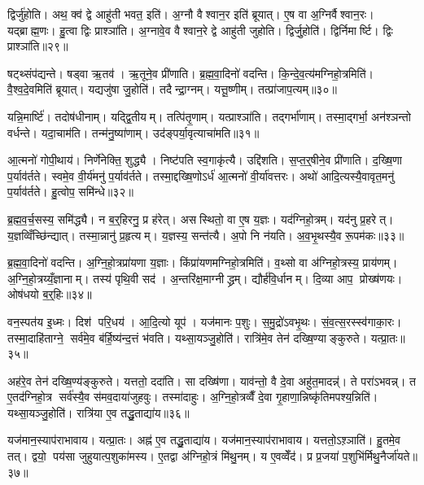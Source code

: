 द्विर्जु॑होति। अथ॒ क्व॑ द्वे आहु॑ती भवत॒ इति॑। अ॒ग्नौ वैश्वान॒र इति॑ ब्रूयात्। ए॒ष वा अ॒ग्निर्वैश्वान॒रः। यद्ब्राह्म॒णः। हु॒त्वा द्विः प्राश्ञा॑ति। अ॒ग्नावे॒व वैश्वान॒रे द्वे आहु॑ती जुहोति। द्विर्जु॒होति॑। द्विर्निमार्ष्टि। द्विः प्राश्ञा॑ति॥२९॥

षट्थ्संप॑द्यन्ते। षड्वा ऋ॒तव॑। ऋ॒तूने॒व प्री॑णाति। ब्र॒ह्म॒वा॒दिनो॑ वदन्ति। कि॒न्दे॒व॒त्य॑मग्निहो॒त्रमिति॑। वै॒श्व॒दे॒वमिति॑ ब्रूयात्। यद्यजु॑षा जु॒होति॑। तदैन्द्रा॒ग्नम्। यत्तू॒ष्णीम्। तत्प्रा॑जाप॒त्यम्॥३०॥

यन्नि॒मार्ष्टि॑। तदोष॑धीनाम्। यद्द्वि॒तीयम्। तत्पि॑तृ॒णाम्। यत्प्राश्ञा॑ति। तद्गर्भा॑णाम्। तस्मा॒द्गर्भा॒ अन॑श्ञन्तो वर्धन्ते। यदा॒चाम॑ति। तन्म॑नु॒ष्या॑णाम्। उद॑ङ्पर्या॒वृत्याचा॑मति॥३१॥

आ॒त्मनो॑ गोपी॒थाय॑। निर्णे॑नेक्ति॒ शुद्ध्यै। निष्ट॑पति स्व॒गाकृ॑त्यै। उद्दि॑शति। स॒प्त॒र्॒षीने॒व प्री॑णाति। द॒ख्षि॒णा प॒र्याव॑र्तते। स्वमे॒व वी॒र्य॑मनु॑ प॒र्याव॑र्तते। तस्मा॒द्दख्षि॒णोऽर्ध॑ आ॒त्मनो॑ वी॒र्या॑वत्तरः। अथो॑ आदि॒त्यस्यै॒वावृत॒मनु॑ प॒र्याव॑र्तते। हु॒त्वोप॒ समि॑न्धे॥३२॥

ब्र॒ह्म॒व॒र्च॒सस्य॒ समि॑द्ध्यै। न ब॒र्॒हिरनु॒ प्र ह॑रेत्। असस्थितो॒ वा ए॒ष य॒ज्ञः। यद॑ग्निहो॒त्रम्। यद॑नु प्र॒हरेत्। य॒ज्ञव्विँच्छि॑न्द्यात्। तस्मा॒न्नानु॑ प्र॒हृत्यम्। य॒ज्ञस्य॒ सन्त॑त्यै। अ॒पो नि न॑यति। अ॒व॒भृ॒थस्यै॒व रू॒पम॑कः॥३३॥\anuvakamend[अ॒भ॒व॒न्भ॒व॒ति॒ जु॒हु॒यान्न॑यति मार्ष्टि॒ द्विःप्राश्ञा॑ति प्राजाप॒त्यमाचा॑मतीन्धेऽकः]

ब्र॒ह्म॒वा॒दिनो॑ वदन्ति। अ॒ग्नि॒हो॒त्रप्रा॑यणा य॒ज्ञाः। किंप्रा॑यणमग्निहो॒त्रमिति॑। व॒थ्सो वा अ॑ग्निहो॒त्रस्य॒ प्राय॑णम्। अ॒ग्नि॒हो॒त्रय्यँ॒ज्ञानाम्। तस्य॑ पृथि॒वी सद॑। अ॒न्तरि॑क्ष॒माग्नीद्ध्रम्। द्यौर्\mbox{}ह॑वि॒र्धानम्। दि॒व्या आप॒ प्रोख्ष॑णयः। ओष॑धयो ब॒र्॒हिः॥३४॥

वन॒स्पत॑य इ॒ध्मः। दिश॑ परि॒धय॑। आ॒दि॒त्यो यूप॑। यज॑मानः प॒शुः। स॒मु॒द्रो॑ऽवभृ॒थः। सं॒व॒त्स॒रस्स्व॑गाका॒रः। तस्मा॒दाहि॑ताग्ने॒ सर्व॑मे॒व ब॑र्\mbox{}हि॒ष्य॑न्द॒त्तं भ॑वति। यथ्सा॒यञ्जु॒होति॑। रात्रि॑मे॒व तेन॑ दख्षि॒ण्याङ्कुरुते। यत्प्रा॒तः॥३५॥

अह॑रे॒व तेन॑ दख्षि॒ण्य॑ङ्कुरुते। यत्ततो॒ ददा॑ति। सा दख्षि॑णा। याव॑न्तो॒ वै दे॒वा अहु॑त॒मादन्न्॑। ते परा॑ऽभवन्न्। त ए॒तद॑ग्निहो॒त्र सर्व॑स्यै॒व स॑मव॒दाया॑जुहवुः। तस्मा॑दाहुः। अ॒ग्नि॒हो॒त्रव्वैँ दे॒वा गृ॒हाणा॒न्निष्कृ॑तिमपश्य॒न्निति॑। यथ्सा॒यञ्जु॒होति॑। रात्रि॑या ए॒व तद्धु॒ताद्या॑य॥३६॥

यज॑मान॒स्याप॑राभावाय। यत्प्रा॒तः। अह्न॑ ए॒व तद्धु॒ताद्या॑य। यज॑मान॒स्याप॑राभावाय। यत्ततो॒ऽश़्ञाति॑। हु॒तमे॒व तत्। द्वयो॒ पय॑सा जुहुयात्प॒शुका॑मस्य। ए॒तद्वा अ॑ग्निहो॒त्रं मि॑थु॒नम्। य ए॒वव्वेँद॑। प्र प्र॒जया॑ प॒शुभि॑र्मिथु॒नैर्जा॑यते॥३७॥

